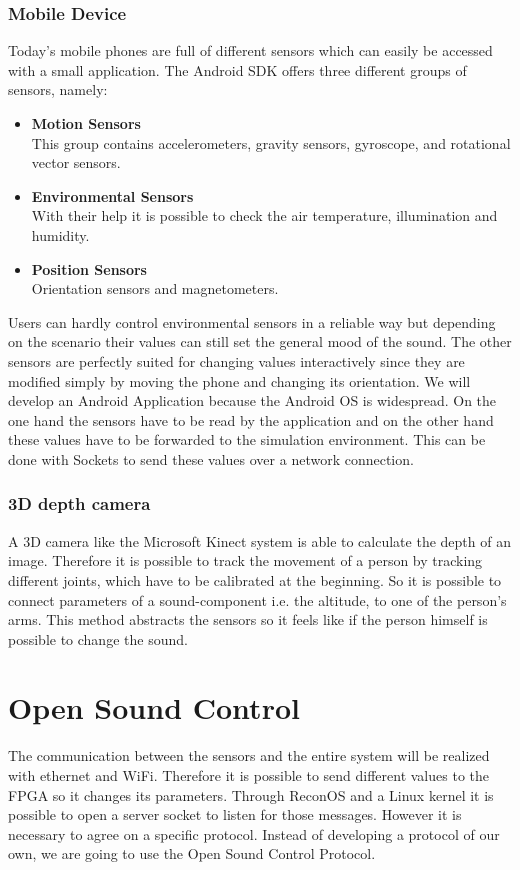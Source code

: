 \subsubsection{Mobile Device}
Today's mobile phones are full of different sensors which can easily be accessed with a small application. The Android SDK offers three different groups of sensors, namely:
\begin{itemize}
	\item \textbf{Motion Sensors} \\
			This group contains accelerometers, gravity sensors, gyroscope, and rotational vector sensors. %
	\item \textbf{Environmental Sensors} \\
			With their help it is possible to check the air temperature, illumination and humidity.
	\item \textbf{Position Sensors} \\
			Orientation sensors and magnetometers.
\end{itemize}

Users can hardly control environmental sensors in a reliable way but depending on the scenario their values can still set the general mood of the sound.
The other sensors are perfectly suited for changing values interactively since they are modified simply by moving the phone and changing its orientation. 
We will develop an Android Application because the Android OS is widespread. 
On the one hand the sensors have to be read by the application and on the other hand these values have to be forwarded to the simulation environment. 
This can be done with Sockets to send these values over a network connection.

\subsubsection{3D depth camera}
A 3D camera like the Microsoft Kinect system is able to calculate the depth of an image. 
Therefore it is possible to track the movement of a person by tracking different joints, which have to be calibrated at the beginning. 
So it is possible to connect parameters of a sound-component i.e. the altitude, to one of the person's arms. 
This method abstracts the sensors so it feels like if the person himself is possible to change the sound.

\section{Open Sound Control}
The communication between the sensors and the entire system will be realized with ethernet and WiFi. 
Therefore it is possible to send different values to the \ac{FPGA} so it changes its parameters. 
Through \ac{ReconOS} and a Linux kernel it is possible to open a server socket to listen for those messages. 
However it is necessary to agree on a specific protocol. Instead of developing a protocol of our own, we are going to use the Open Sound Control Protocol.

